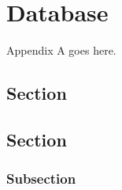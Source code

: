 
\chapter{Database}
\label{AppendixB}

Appendix A goes here.



\section{Section}
\noindent \lipsum[1][3-5] %
\newline


\section{Section}
\noindent \lipsum[1][3-5] %
\newline

\subsection{Subsection}
\noindent \lipsum[1][3-5] %


